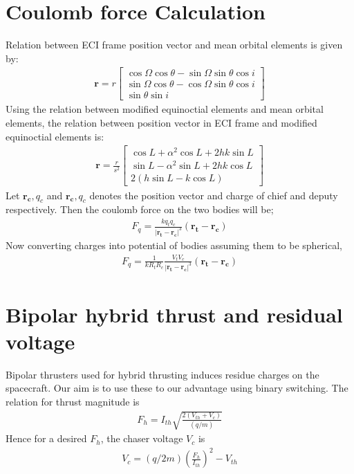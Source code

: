 \documentclass[]{article}
\theoremstyle{remark}
\theoremstyle{definition}
\begin{document}
	\section{Coulomb force Calculation}
	Relation between ECI frame position vector and mean orbital elements is given by:
	\begin{align}
		\mathbf{r} = r\begin{bmatrix}
			\cos{\Omega}\cos{\theta}-\sin{\Omega}\sin{\theta}\cos{i} \\ \sin{\Omega}\cos{\theta}-\cos{\Omega}\sin{\theta}\cos{i} \\ \sin{\theta}\sin{i}
		\end{bmatrix} 
	\end{align}
	Using the relation between modified equinoctial elements and mean orbital elements, the relation between position vector in ECI frame and modified equinoctial elements is:
	\begin{align}
		\mathbf{r} = \frac{r}{s^2}\begin{bmatrix}
			\cos{L}+\alpha^2\cos{L}+2hk\sin{L} \\ \sin{L}- \alpha^2\sin{L}+2hk\cos{L} \\ 2(h\sin{L}-k\cos{L})
		\end{bmatrix}  
	\end{align}
	Let $\mathbf{r_c},q_c$ and $\mathbf{r_c},q_c$ denotes the position vector and charge of chief and deputy respectively. Then the coulomb force on the two bodies will be;
	\begin{align}
		F_q = \frac{kq_t q_c}{| \mathbf{r_t-r_c}|^3}(\mathbf{r_t-r_c})
	\end{align}
	Now converting charges into potential of bodies assuming them to be spherical,
	\begin{align}
		F_q = \frac{1}{kR_t R_c}\frac{V_t V_c}{| \mathbf{r_t-r_c}|^3}(\mathbf{r_t-r_c})
	\end{align}
	\section{Bipolar hybrid thrust and residual voltage}
	Bipolar thrusters used for hybrid thrusting induces residue charges on the spacecraft. Our aim is to use these to our advantage using binary switching.
	The relation for thrust magnitude is 
	\begin{align}
		F_h = I_{th}\sqrt{\frac{2(V_{th}+V_c)}{(q/m)}} 
	\end{align}
	Hence for a desired $F_h$, the chaser voltage $V_c$ is
	\begin{align}
		V_c = (q/2m)\left(\frac{F_h}{I_{th}}\right)^2 - V_{th}
	\end{align}
	\begin{comment}
	Then $F_q$ is modified as:
	\begin{align}
		F_q^* = \frac{1}{kR_t R_c}\frac{V_t (V_c+V_i)}{| \mathbf{r_t-r_c}|^3}(\mathbf{r_t-r_c})
	\end{align}	
	\end{comment}
\end{document}
